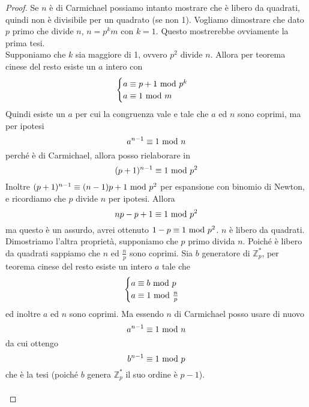 \begin{proof}
	Se $n$ è di Carmichael possiamo intanto mostrare che è libero da quadrati, quindi non è divisibile per un quadrato (se non 1). Vogliamo dimostrare che dato $p$ primo che divide $n$, $n=p^km$ con $k=1$. Questo mostrerebbe ovviamente la prima tesi. \\ Supponiamo che $k$ sia maggiore di 1, ovvero $p^2$ divide $n$. Allora per teorema cinese del resto esiste un $a$ intero con 
	\begin{equation*}
	\begin{cases}
	a\equiv p+1\ \mathrm{mod}\ p^k\\
	a\equiv 1\ \mathrm{mod}\ m
	\end{cases}
	\end{equation*}
	Quindi esiste un $a$ per cui la congruenza vale e tale che $a$ ed $n$ sono coprimi, ma per ipotesi
	\begin{equation*}
	a^{n-1}\equiv1\ \mathrm{mod}\ n
	\end{equation*}
	perché è di Carmichael, allora posso rielaborare in 
	\begin{equation*}
	(p+1)^{n-1}\equiv1\ \mathrm{mod}\ p^2
	\end{equation*}
	Inoltre $(p+1)^{n-1}\equiv(n-1)p+1\ \mathrm{mod}\ p^2$ per espansione con binomio di Newton, e ricordiamo che $p$ divide $n$ per ipotesi. Allora
	\begin{equation*}
	np-p+1\equiv1\ \mathrm{mod}\ p^2
	\end{equation*}
	ma questo è un assurdo, avrei ottenuto $1-p\equiv1\ \mathrm{mod}\ p^2$. $n$ è libero da quadrati. \\ Dimostriamo l'altra proprietà, supponiamo che $p$ primo divida $n$. Poiché è libero da quadrati sappiamo che $n$ ed $\frac{n}{p}$ sono coprimi. Sia $b$ generatore di $\mathbb{Z}_p^*$, per teorema cinese del resto esiste un intero $a$ tale che 
	\begin{equation*}
	\begin{cases}
	a\equiv b\ \mathrm{mod}\ p\\
	a\equiv 1\ \mathrm{mod}\ \frac{n}{p}
	\end{cases}
	\end{equation*}
	ed inoltre $a$ ed $n$ sono coprimi. Ma essendo $n$ di Carmichael posso usare di nuovo
	\begin{equation*}
	a^{n-1}\equiv1\ \mathrm{mod}\ n
	\end{equation*}
	da cui ottengo
	\begin{equation*}
	b^{n-1}\equiv1\ \mathrm{mod}\ p
	\end{equation*}
	che è la tesi (poiché $b$ genera $\mathbb{Z}_p^*$ il suo ordine è $p-1$). \\ \\ 

\end{proof}
